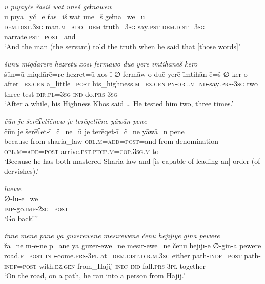 \ea \label{ŽP.77}
\textit{ū pīyāyče řāsiš wāt ūneš gēɫnāwew} \\ 
\gll ū pīyā=yč=e řās=iš wāt ūne=š gēɫnā=we=ū \\ 
 \textsc{dem.dist}\textsc{.3sg} man\textsc{.m}\textsc{=add}\textsc{=dem} truth\textsc{=3sg} say\textsc{.pst} \textsc{dem.dist}\textsc{=3sg} narrate\textsc{.pst}\textsc{=\textsc{post}}=and \\ 
\glt `And the man (the servant) told the truth when he said that [those words]'
\z 
 
\ea \label{ŽP.82}
\textit{šūnū miqdārēre hezretū xosī fermāwo duē yerē īmtihānēš kero} \\ 
\gll šūn=ū miqdārē=re hezret=ū xos-ī ∅-fermāw-o duē yerē īmtihān-ē=š ∅-ker-o \\ 
 after\textsc{\textsc{=ez.gen}} a\_little\textsc{=\textsc{post}} his\_highness\textsc{.m}\textsc{\textsc{=ez.gen}} \textsc{pn}\textsc{-obl}\textsc{.m} \textsc{ind-}say\textsc{.prs}\textsc{-3sg} two three test\textsc{-dir}\textsc{.pl}\textsc{=3sg} \textsc{ind-}do\textsc{.prs}\textsc{-3sg} \\ 
\glt `After a while, his Highness Khos said … He tested him two, three times.'
\z 
 
\ea \label{ŽP.88}
\textit{čūn je šerēʕetīčnew je terēqetīčne yāwān pene} \\ 
\gll čūn je šerēʕet-ī=č=ne=ū je terēqet-ī=č=ne yāwā=n pene \\ 
 because from sharia\_law\textsc{-obl}\textsc{.m}\textsc{=add}\textsc{=\textsc{post}}=and from denomination\textsc{-obl}\textsc{.m}\textsc{=add}\textsc{=\textsc{post}} arrive\textsc{.pst}\textsc{.ptcp}\textsc{.m}\textsc{=cop}\textsc{.3sg}\textsc{.m} to \\ 
\glt `Because he has both mastered Sharia law and [is capable of leading an] order (of dervishes).'
\z 
 
\ea \label{ŽP.95}
\textit{luewe} \\ 
\gll ∅-lu-e=we \\ 
 \textsc{imp-}go.\textsc{imp-}\textsc{2sg}\textsc{=\textsc{post}} \\ 
\glt `Go back!’'
\z 
 
\ea \label{ŽP.97}
\textit{řāne mēnē pāne yā guzerēwene mesīrēwene čenū hejījīyē ginā pēwere} \\ 
\gll řā=ne m-ē-nē p=āne yā guzer-ēwe=ne mesīr-ēwe=ne čenū hejījī-ē ∅-gin-ā pēwere \\ 
 road\textsc{.f}\textsc{=\textsc{post}} \textsc{ind-}come\textsc{.prs}\textsc{-3pl} at=\textsc{dem.dist}\textsc{.dir}\textsc{.m}\textsc{.3sg} either path\textsc{-indf}\textsc{=\textsc{post}} path\textsc{-indf}\textsc{=\textsc{post}} with\textsc{.ez.gen} from\_Hajij\textsc{-indf} \textsc{ind-}fall\textsc{.prs}\textsc{-3pl} together \\ 
\glt `On the road, on a path, he ran into a person from Hajij.'
\z 
 
